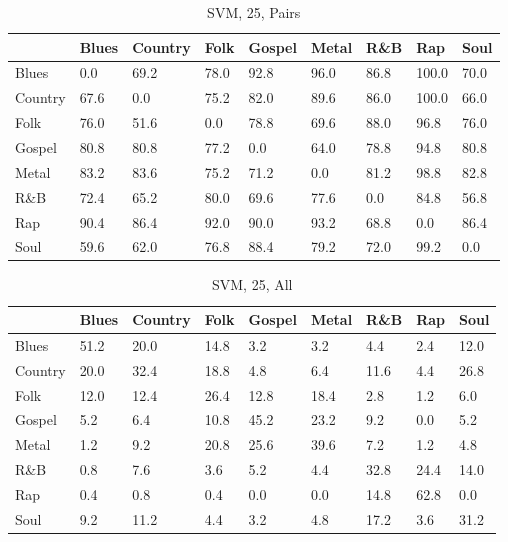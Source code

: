 \documentclass[a4paper,oneside]{article}
\begin{document}
\begin{table}[H]\centering
\caption{SVM, 25, Pairs}
\begin{tabu}{l|*{8}{l}}
 & Blues & Country & Folk & Gospel & Metal & R\&B & Rap & Soul \\ \hline
Blues & 0.0 & 69.2 & 78.0 & 92.8 & 96.0 & 86.8 & 100.0 & 70.0 \\
Country & 67.6 & 0.0 & 75.2 & 82.0 & 89.6 & 86.0 & 100.0 & 66.0 \\
Folk & 76.0 & 51.6 & 0.0 & 78.8 & 69.6 & 88.0 & 96.8 & 76.0 \\
Gospel & 80.8 & 80.8 & 77.2 & 0.0 & 64.0 & 78.8 & 94.8 & 80.8 \\
Metal & 83.2 & 83.6 & 75.2 & 71.2 & 0.0 & 81.2 & 98.8 & 82.8 \\
R\&B & 72.4 & 65.2 & 80.0 & 69.6 & 77.6 & 0.0 & 84.8 & 56.8 \\
Rap & 90.4 & 86.4 & 92.0 & 90.0 & 93.2 & 68.8 & 0.0 & 86.4 \\
Soul & 59.6 & 62.0 & 76.8 & 88.4 & 79.2 & 72.0 & 99.2 & 0.0 \\
\end{tabu}
\end{table}

\begin{table}[H]\centering
\caption{SVM, 25, All}
\begin{tabu}{l|*{8}{l}}
 & Blues & Country & Folk & Gospel & Metal & R\&B & Rap & Soul \\ \hline
Blues & 51.2 & 20.0 & 14.8 & 3.2 & 3.2 & 4.4 & 2.4 & 12.0 \\
Country & 20.0 & 32.4 & 18.8 & 4.8 & 6.4 & 11.6 & 4.4 & 26.8 \\
Folk & 12.0 & 12.4 & 26.4 & 12.8 & 18.4 & 2.8 & 1.2 & 6.0 \\
Gospel & 5.2 & 6.4 & 10.8 & 45.2 & 23.2 & 9.2 & 0.0 & 5.2 \\
Metal & 1.2 & 9.2 & 20.8 & 25.6 & 39.6 & 7.2 & 1.2 & 4.8 \\
R\&B & 0.8 & 7.6 & 3.6 & 5.2 & 4.4 & 32.8 & 24.4 & 14.0 \\
Rap & 0.4 & 0.8 & 0.4 & 0.0 & 0.0 & 14.8 & 62.8 & 0.0 \\
Soul & 9.2 & 11.2 & 4.4 & 3.2 & 4.8 & 17.2 & 3.6 & 31.2 \\
\end{tabu}
\end{table}
\end{document}
